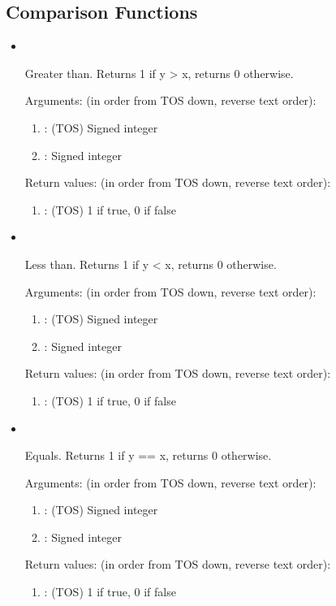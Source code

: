 \subsection{Comparison Functions}
\begin{itemize}

\item \forthinlinehl{>}\ 

\noindent Greater than. Returns 1 if y > x, returns 0 otherwise.

\noindent Arguments: (in order from TOS down, reverse text order):
\begin{enumerate}
\item {}: (TOS) Signed integer
\item {}: Signed integer
\end{enumerate}

\noindent Return values: (in order from TOS down, reverse text order):
\begin{enumerate}
\item {}: (TOS) 1 if true, 0 if false
\end{enumerate}

\item \forthinlinehl{<}\ 

\noindent Less than. Returns 1 if y < x, returns 0 otherwise.

\noindent Arguments: (in order from TOS down, reverse text order):
\begin{enumerate}
\item {}: (TOS) Signed integer
\item {}: Signed integer
\end{enumerate}

\noindent Return values: (in order from TOS down, reverse text order):
\begin{enumerate}
\item {}: (TOS) 1 if true, 0 if false
\end{enumerate}

\item \forthinlinehl{==}\ 

\noindent Equals. Returns 1 if y == x, returns 0 otherwise.

\noindent Arguments: (in order from TOS down, reverse text order):
\begin{enumerate}
\item {}: (TOS) Signed integer
\item {}: Signed integer
\end{enumerate}

\noindent Return values: (in order from TOS down, reverse text order):
\begin{enumerate}
\item {}: (TOS) 1 if true, 0 if false
\end{enumerate}

\end{itemize}
